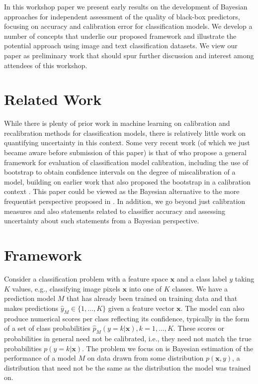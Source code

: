 \documentclass{article}
\newcommand{\ux}{{\mathbf{x}}}
\begin{document}
In this workshop paper we present early results on the development of Bayesian approaches for independent assessment of the quality of black-box predictors, focusing on accuracy and calibration error for classification models.
We develop a number of concepts that underlie our proposed framework and illustrate the potential approach using image and text classification datasets.
We view our paper as preliminary work that should spur further discussion and interest among attendees of this workshop.


\section{Related Work}

While there is plenty of prior work in machine learning on calibration and recalibration methods for classification models, there is relatively little work on quantifying uncertainty in this context.
Some very recent work (of which we just became aware before submission of this paper) is that of \cite{vaicenavicius19a} who propose a general framework for evaluation of classification model calibration, including the use of bootstrap to obtain confidence intervals on the degree of miscalibration of a model, building on earlier work that also proposed the bootstrap in a calibration context \cite{brocker2007increasing}.
This paper could be viewed as the Bayesian alternative to the more frequentist perspective proposed in \cite{vaicenavicius19a}.
In addition, we go beyond just calibration measures and also statements related to classifier accuracy and assessing uncertainty about such statements from a Bayesian perspective.


\section{Framework}

Consider a classification problem with a feature space $\ux$ and a class label $y$ taking $K$ values, e.g., classifying image pixels $\ux$ into one of $K$ classes.
We have a prediction model $M$ that has already been trained on training data and that makes predictions $\hat{y}_M \in \{1, \ldots, K\}$ given a feature vector $\ux$.
The model can also produce numerical scores per class reflecting its confidence, typically in the form of a set of class probabilities $\hat{p}_M(y = k | \ux), k = 1,\ldots,K$.
These scores or probabilities in general need not be calibrated, i.e., they need not match the true probabilities $p(y=k | \ux)$.
The problem we focus on is Bayesian estimation of the performance of a model $M$ on data drawn from some distribution $p(\ux,y)$, a distribution that need not be the same as the distribution the model was trained on. 
\end{document}
